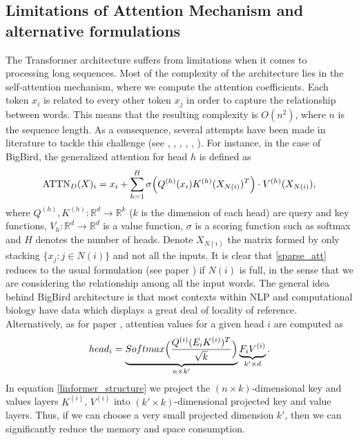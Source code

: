 \documentclass[11pt]{article}
\theoremstyle{plain}
\theoremstyle{remark}
\theoremstyle{definition}
\theoremstyle{plain}
\theoremstyle{plain}
\begin{document}
\subsection{Limitations of Attention Mechanism and alternative formulations}
The Transformer architecture suffers from limitations when it comes to processing long sequences. Most of the complexity of the architecture lies in the self-attention mechanism, where we compute the attention coefficients. Each token $x_i$ is related to every other token $x_j$ in order to capture the relationship between words. This means that the resulting complexity is $O(n^2)$, where $n$ is the sequence length. As a consequence, several attempts have been made in literature to tackle this challenge (see \cite{bert}, \cite{bigbird}, \cite{longform}, \cite{approx}, \cite{linear transformer}, \cite{matrix approx}). \vskip2mm \noindent
For instance, in the case of BigBird, the generalized attention for head $h$ is defined as 
\begin{equation} \label{sparse_att}
\text{ATTN}_D(X)_i=x_i+\sum_{h=1}^H\sigma\Bigl(Q^{(h)}(x_i)K^{(h)}(X_{N(i)})^T\Bigr)\cdot V^{(h)}(X_{N(i)}),
\end{equation}
where $Q^{(h)},K^{(h)}: \mathbb{R}^d \to \mathbb{R}^k$ ($k$ is the dimension of each head) are query and key functions, $V_h: \mathbb{R}^d \to \mathbb{R}^d$ is a value function, $\sigma$ is a scoring function such as softmax and $H$ denotes the number of heads. Denote $X_{N(i)}$ the matrix formed by only stacking $\{x_j : j \in N(i)\}$ and not all the inputs. It is clear that \eqref{sparse_att} reduces to the usual formulation (see paper \cite{Mainarticle}) if $N(i)$ is full, in the sense that we are considering the relationship among all the input words. The general idea behind BigBird architecture is that most contexts within NLP and computational biology have data which displays a great deal of locality of reference. \vskip2mm \noindent
Alternatively, as for paper \cite{matrix approx}, attention values for a given head $i$ are computed as 
\begin{equation} \label{linformer_structure}
    head_i=\underbrace{Softmax\Bigl(\frac{Q^{(i)}(E_iK^{(i)})^T}{\sqrt{k}}\Bigr)}_{n \times k'}\underbrace{F_iV^{(i)}}_{k'\times d}.
\end{equation}
In equation \eqref{linformer_structure} we project the $(n\times k)$-dimensional key and values layers $K^{(i)}$, $V^{(i)}$ into $(k'\times k)$-dimensional projected key and value layers. Thus, if we can choose a very small projected dimension $k'$, then we can significantly reduce the memory and space consumption.
\end{document}
